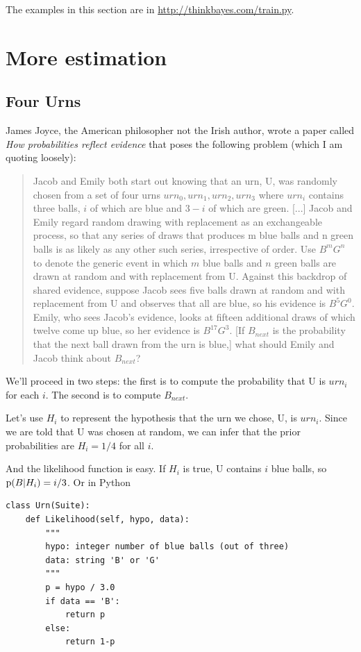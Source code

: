 \documentclass[12pt]{book}
\begin{document}
The examples in this section are in \url{http://thinkbayes.com/train.py}.


\chapter{More estimation}

\section{Four Urns}

James Joyce, the American philosopher not the Irish author, wrote
a paper called {\it How probabilities reflect evidence} that poses
the following problem (which I am quoting loosely):

\begin{quote}
Jacob and Emily both start out knowing that an urn, U, was
randomly chosen from a set of four urns ${urn_0, urn_1, urn_2, urn_3}$
where $urn_i$ contains three balls, $i$ of which are blue and $3-i$ of
which are green. [...]  Jacob and Emily regard random drawing with
replacement as an exchangeable process, so that any series of draws
that produces m blue balls and n green balls is as likely as any other
such series, irrespective of order.  Use $B^m G^n$ to denote the generic
event in which $m$ blue balls and $n$ green balls are drawn at random
and with replacement from U.  Against this backdrop of shared
evidence, suppose Jacob sees five balls drawn at random and with
replacement from U and observes that all are blue, so his evidence is
$B^5 G^0$.  Emily, who sees Jacob's evidence, looks at fifteen additional
draws of which twelve come up blue, so her evidence is $B^{17} G^3$.  [If
$B_{next}$ is the probability that the next ball drawn from the urn is
blue,] what should Emily and Jacob think about $B_{next}$?
\end{quote}

We'll proceed in two steps: the first is to compute the probability
that U is $urn_i$ for each $i$.  The second is to compute $B_{next}$.

Let's use $H_i$ to represent the hypothesis that the urn we chose, U,
is $urn_i$.  Since we are told that U was chosen at random, we can
infer that the prior probabilities are $H_i = 1/4$ for all $i$.

And the likelihood function is easy.  If $H_i$ is true, U contains
$i$ blue balls, so $\mathrm{p}(B|H_i) = i/3$.  Or in Python

\begin{verbatim}
class Urn(Suite):
    def Likelihood(self, hypo, data):
        """
        hypo: integer number of blue balls (out of three)
        data: string 'B' or 'G'
        """
        p = hypo / 3.0
        if data == 'B':
            return p
        else:
            return 1-p
\end{verbatim}
\end{document}
